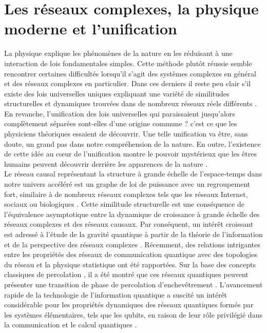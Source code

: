 \section{Les réseaux complexes, la physique moderne et l'unification}
La physique explique les phénomènes de la nature en les réduisant à une interaction de lois fondamentales simples. Cette
méthode plutôt réussie semble rencontrer certaines difficultés lorsqu'il s'agit des systèmes complexes en général et des 
réseaux complexes en particulier. Dans ces derniers il reste peu clair s'il existe des lois universelles uniques expliquant
une variété de similitudes structurelles et dynamiques trouvées dans de nombreux réseaux réels différents  
\cite{K-al2012,BS2009,La-al2009,Li-al2011}. En revanche, l'\textsf{unification} des lois universelles qui paraissaient
jusqu'alors complètement séparées sont-elles d'une  origine commune ? c'est ce que les physiciens théoriques essaient de
découvrir. Une telle  \textsf{unification} va \^{e}tre, sans doute, un grand pas dans notre compréhension de la nature.
En outre, l'existence de cette idée au cœur de l'unification montre le pouvoir mystérieux que les êtres humains
peuvent découvrir derrière les apparences de la nature \cite{Sm1997}.\\
Le réseau causal représentant la structure à grande échelle de l'espace-temps dans notre univers accéléré est un graphe de 
loi de puissance avec un regroupement fort, similaire à de nombreux réseaux complexes tels que les réseaux Internet, 
sociaux ou biologiques \cite{K-al2012}. Cette similitude structurelle est une conséquence de l'équivalence asymptotique
entre la dynamique de croissance à grande échelle des réseaux complexes et des réseaux causaux. Par conséquent, un intérêt 
croissant est adressé à l'étude de la gravité quantique à partir de la théorie de l'information et de la perspective des 
réseaux complexes \cite{Tr2015,Bi-al2015}. Récemment, des relations intrigantes entre les propriétés des réseaux de 
communication quantique avec des topologies du réseau et la physique statistique ont été rapportées. Sur la base des
concepts classiques de percolation \cite{BR2006}, il a été montré que ces réseaux quantiques peuvent présenter une
transition de phase de percolation d'enchevêtrement \cite{Ac-al2007,Sa1999}.
L'avancement rapide de la technologie de l'information quantique a suscité un intérêt considérable pour les propriétés 
dynamiques des réseaux quantiques formés par les systèmes élémentaires, tels que les qubits, en raison de leur rôle
privilégié dans la communication et le calcul quantiques \cite{J-al2015,BG2007,MC2000}.\\

